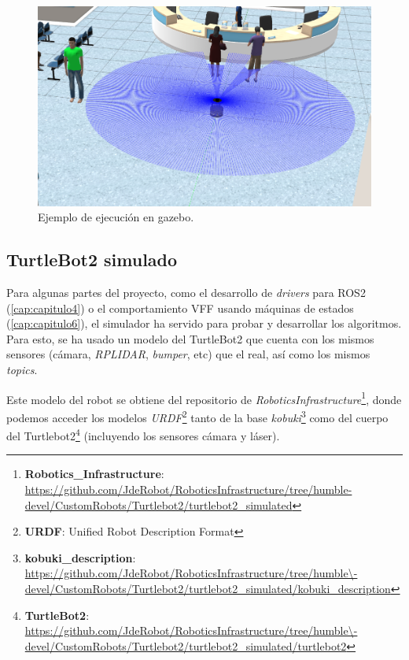\begin{figure} [H]
    \begin{center}
        \includegraphics[width=13cm]{figs/c3/gazebo_sim.png}
    \end{center}
    \caption[Simulador Gazebo.]{Ejemplo de ejecución en gazebo.}
    \label{fig:gazebo_example}
\end{figure}

\subsection{TurtleBot2 simulado}
\label{subsec:turtlebot2_sim}

Para algunas partes del proyecto, como el desarrollo de \textit{drivers} para ROS2 (\ref{cap:capitulo4}) o el comportamiento VFF usando
máquinas de estados (\ref{cap:capitulo6}), el simulador ha servido para probar y desarrollar los algoritmos. Para esto, se ha usado un modelo del
TurtleBot2 que cuenta con los mismos sensores (cámara, \textit{RPLIDAR}, \textit{bumper}, etc) que el real, así como los mismos \textit{topics}.

Este modelo del robot se obtiene del repositorio de
\textit{RoboticsInfrastructure}\footnote{\textbf{Robotics\_Infrastructure}: \url{
    https://github.com/JdeRobot/RoboticsInfrastructure/tree/humble-devel/CustomRobots/Turtlebot2/turtlebot2_simulated}},
donde podemos acceder los modelos \textit{URDF}\footnote{\textbf{URDF}: Unified Robot Description Format} tanto de la base
\textit{kobuki}\footnote{\textbf{kobuki\_description}: \url{
    https://github.com/JdeRobot/RoboticsInfrastructure/tree/humble\-devel/CustomRobots/Turtlebot2/turtlebot2_simulated/kobuki_description}}
como del cuerpo del Turtlebot2\footnote{\textbf{TurtleBot2}: \url{
    https://github.com/JdeRobot/RoboticsInfrastructure/tree/humble\-devel/CustomRobots/Turtlebot2/turtlebot2_simulated/turtlebot2}}
(incluyendo los sensores cámara y láser).

